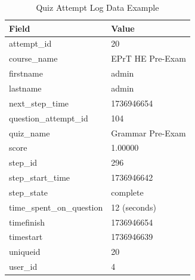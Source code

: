 \begin{table}[htbp]
	\centering
	\caption{Quiz Attempt Log Data Example}
	\label{tab:quiz_attempt_log}
	\begin{tabular}{|l|l|}
		\hline
		\textbf{Field} & \textbf{Value} \\ \hline
		attempt\_id & 20 \\ \hline
		course\_name & EPrT HE Pre-Exam \\ \hline
		firstname & admin \\ \hline
		lastname & admin \\ \hline
		next\_step\_time & 1736946654 \\ \hline
		question\_attempt\_id & 104 \\ \hline
		quiz\_name & Grammar Pre-Exam \\ \hline
		score & 1.00000 \\ \hline
		step\_id & 296 \\ \hline
		step\_start\_time & 1736946642 \\ \hline
		step\_state & complete \\ \hline
		time\_spent\_on\_question & 12 (seconds) \\ \hline
		timefinish & 1736946654 \\ \hline
		timestart & 1736946639 \\ \hline
		uniqueid & 20 \\ \hline
		user\_id & 4 \\ \hline
	\end{tabular}
\end{table}

